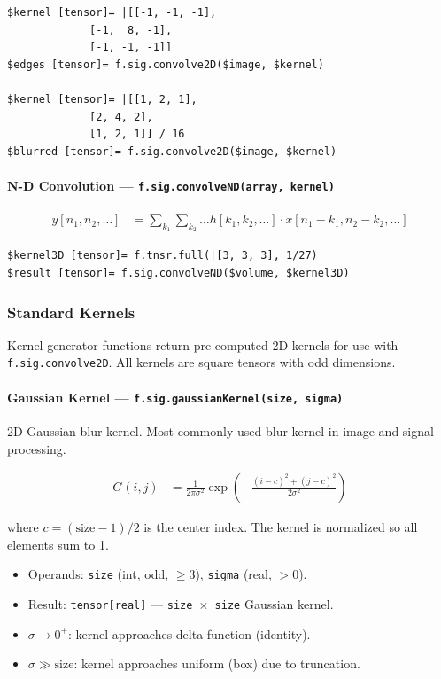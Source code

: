 \begin{verbatim}
$kernel [tensor]= |[[-1, -1, -1],
             [-1,  8, -1],
             [-1, -1, -1]]
$edges [tensor]= f.sig.convolve2D($image, $kernel)

$kernel [tensor]= |[[1, 2, 1],
             [2, 4, 2],
             [1, 2, 1]] / 16
$blurred [tensor]= f.sig.convolve2D($image, $kernel)
\end{verbatim}

\paragraph{N-D Convolution --- \texttt{f.sig.convolveND(array, kernel)}}

\begin{align}
y[n_1, n_2, \ldots] &= \sum_{k_1} \sum_{k_2} \ldots h[k_1, k_2, \ldots] \cdot x[n_1{-}k_1, n_2{-}k_2, \ldots] \label{eq:sig-convnd}
\end{align}

\begin{verbatim}
$kernel3D [tensor]= f.tnsr.full(|[3, 3, 3], 1/27)
$result [tensor]= f.sig.convolveND($volume, $kernel3D)
\end{verbatim}

\subsubsection{Standard Kernels}

Kernel generator functions return pre-computed 2D kernels for use with \texttt{f.sig.convolve2D}. All kernels are square tensors with odd dimensions.

\paragraph{Gaussian Kernel --- \texttt{f.sig.gaussianKernel(size, sigma)}}

2D Gaussian blur kernel. Most commonly used blur kernel in image and signal processing.

\begin{align}
G(i,j) &= \frac{1}{2\pi\sigma^2} \exp\!\left(-\frac{(i-c)^2 + (j-c)^2}{2\sigma^2}\right) \label{eq:sig-gaussian-kernel}
\end{align}

where $c = (\text{size}-1)/2$ is the center index. The kernel is normalized so all elements sum to 1.

\begin{itemize}
\item Operands: \texttt{size} (int, odd, $\geq 3$), \texttt{sigma} (real, $> 0$).
\item Result: \texttt{tensor[real]} --- \texttt{size $\times$ size} Gaussian kernel.
\item $\sigma \to 0^+$: kernel approaches delta function (identity).
\item $\sigma \gg \text{size}$: kernel approaches uniform (box) due to truncation.
\end{itemize}

